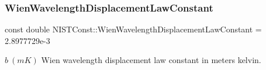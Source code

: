 \subsubsection{\texorpdfstring{Wien\+Wavelength\+Displacement\+Law\+Constant}{WienWavelengthDisplacementLawConstant}}
{\footnotesize\ttfamily const double N\+I\+S\+T\+Const\+::\+Wien\+Wavelength\+Displacement\+Law\+Constant = 2.\+8977729e-\/3}

$b \ (m K)$ Wien wavelength displacement law constant in meters kelvin. 